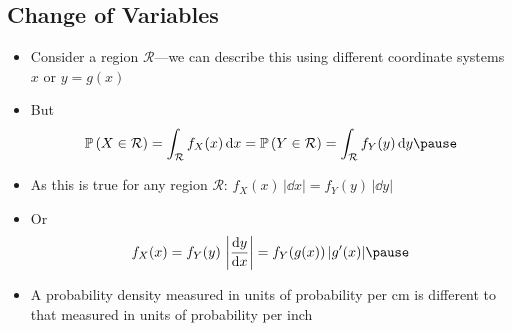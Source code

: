 \begin{slide}
\section[-2]{Change of Variables}
  
\begin{PauseHighLight}
  \begin{itemize}
  \item Consider a region $\mathcal{R}$---we can describe this using
    different coordinate systems $x$ or $y= g(x)$\pause
  \item But
    \begin{align*}
      \Prob{X\in\mathcal{R}}
      = \int_{\mathcal{R}} f_{X}(x) \, \dd x
      =  \Prob{Y\in\mathcal{R}}
      = \int_{\mathcal{R}} f_{Y}(y) \, \dd y\pause
    \end{align*}
  \item As this is true for any region $\mathcal{R}$:
    $f_{X}(x)\, |\dd x| = f_{Y}(y) \, |\dd y|$\pause
  \item Or
    \begin{align*}
      f_{X}(x)  = f_{Y}(y) \, \left| \frac{\dd
      y}{\dd x} \right| = f_{Y}(g(x)) \, | g'(x) |
      \pause
    \end{align*}
  \item A probability density measured in units of probability per
    cm is different to that measured in units of probability per
    inch\pause 
  \end{itemize}
\end{PauseHighLight}

\end{slide}



